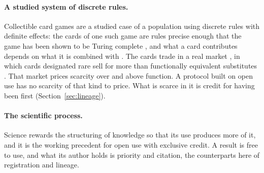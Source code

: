 \paragraph{A studied system of discrete rules.} Collectible card games are a studied case of a population using
discrete rules with definite effects: the cards of one such game are rules precise enough that the game has been
shown to be Turing complete \citep{churchill2021magic}, and what a card contributes depends on what it is combined
with \citep{kritz2025synergy}. The cards trade in a real market \citep{luckingreiley1999magic}, in which cards
designated rare sell for more than functionally equivalent substitutes \citep{hughes2022rarity}. That market
prices scarcity over and above function. A protocol built on open use has no scarcity of that kind to price. What
is scarce in it is credit for having been first (Section~\ref{sec:lineage}).

\paragraph{The scientific process.} Science rewards the structuring of knowledge so that its use produces more of
it, and it is the working precedent for open use with exclusive credit. A result is free to use, and what its
author holds is priority and citation, the counterparts here of registration and lineage. 
